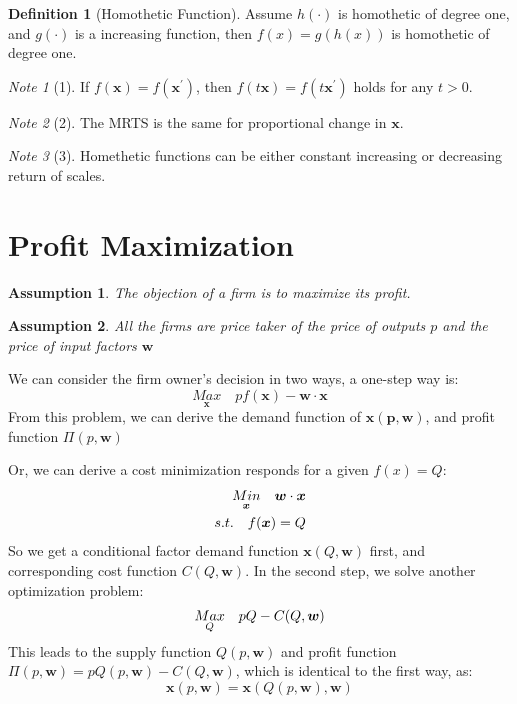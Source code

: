 \documentclass{book}
\theoremstyle{plain}
\newtheorem{asm}{Assumption}[section]
\theoremstyle{definition}
\newtheorem{defn}{Definition}[section]
\theoremstyle{remark}
\newtheorem*{note}{Note}
\begin{document}
\begin{defn}[Homothetic Function]
Assume $h(\cdot)$ is homothetic of degree one, and $g(\cdot)$  is a increasing function, then $f(x)=g(h(x))$ is homothetic of degree one.
\end{defn}

\begin{note}[1]
	If $f(\bm{x}) = f(\bm{x^{'}})$, then $f(t\bm{x}) = f(t\bm{x^{'}})$ holds for any $t>0$.
\end{note}

\begin{note}[2]
The MRTS is the same for proportional change in $\bm{x}$.
\end{note}

\begin{note}[3]
Homethetic functions can be either constant increasing or decreasing return of scales.
\end{note}


\section{Profit Maximization}
\begin{asm}
	The objection of a firm is to maximize its profit.
\end{asm}
\begin{asm}
	All the firms are price taker of the price of outputs $p$ and the price of input factors $\bm{w}$
\end{asm}

We can consider the firm owner's decision in two ways, a one-step way is:
\begin{equation}
	\underset{\bm{x}}{Max}\quad p f(\bm{x}) - \bm{w}\cdot\bm{x}
\end{equation}
From this problem, we can derive the demand function of $\bm{x(p,\bm{w})}$, and profit function $\Pi(p, \bm{w})$

Or, we can derive a cost minimization responds for a given $f(x) = Q$:
\begin{align} \notag
	\underset{\bm{x}}{Min}\quad \bm{w}\cdot\bm{x}\\ \notag
	s.t. \quad f(\bm{x})=Q
\end{align}
So we get a conditional factor demand function $\bm{x}(Q, \bm{w})$ first, and corresponding cost function $C(Q, \bm{w})$. In the second step, we solve another optimization problem:
\begin{align} \notag
	\underset{Q}{Max}\quad pQ - C(Q, \bm{w})
\end{align}
This leads to the supply function $Q(p, \bm{w})$ and profit function $\Pi(p,\bm{w}) = pQ(p, \bm{w}) - C(Q, \bm{w})$, which is identical to the first way, as:
\begin{equation}
	\bm{x}(p,\bm{w}) = \bm{x}(Q(p,\bm{w}), \bm{w})
\end{equation}
\end{document}
